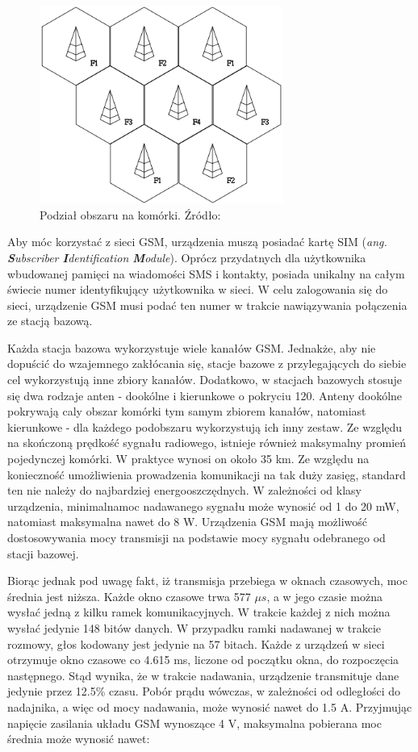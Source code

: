 \begin{figure}[H]
	\centering
	\includegraphics[width=8cm]{img/theory/GSM/cell_structure.png}
	\caption{Podział obszaru na komórki. Źródło: \cite{GSM_wiki}}
	\label{fig:image_gsm_cells}
\end{figure}

Aby móc korzystać z sieci GSM, urządzenia muszą posiadać kartę SIM (\textit{ang. \textbf{S}ubscriber \textbf{I}dentification \textbf{M}odule}). Oprócz przydatnych dla użytkownika wbudowanej pamięci na wiadomości SMS i kontakty, posiada unikalny na całym świecie numer identyfikujący użytkownika w sieci. W celu zalogowania się do sieci, urządzenie GSM musi podać ten numer w trakcie nawiązywania połączenia ze stacją bazową. 

Każda stacja bazowa wykorzystuje wiele kanałów GSM. Jednakże, aby nie dopuścić do wzajemnego zakłócania się, stacje bazowe z przylegających do siebie cel wykorzystują inne zbiory kanałów. Dodatkowo, w stacjach bazowych stosuje się dwa rodzaje anten - dookólne i kierunkowe o pokryciu 120\degree. Anteny dookólne pokrywają caly obszar komórki tym samym zbiorem kanałów, natomiast kierunkowe - dla każdego podobszaru wykorzystują ich inny zestaw. Ze względu na skończoną prędkość sygnału radiowego, istnieje również maksymalny promień pojedynczej komórki. W praktyce wynosi on około 35 km. Ze względu na konieczność umożliwienia prowadzenia komunikacji na tak duży zasięg, standard ten nie należy do najbardziej energooszczędnych. W zależności od klasy urządzenia, minimalnamoc nadawanego sygnału może wynosić od 1 do 20 mW, natomiast maksymalna nawet do 8 W. Urządzenia GSM mają możliwość dostosowywania mocy transmisji na podstawie mocy sygnału odebranego od stacji bazowej. 

Biorąc jednak pod uwagę fakt, iż transmisja przebiega w oknach czasowych, moc średnia jest niższa. Każde okno czasowe trwa 577 $\mu s$, a w jego czasie można wysłać jedną z kilku ramek komunikacyjnych. W trakcie każdej z nich można wysłać jedynie 148 bitów danych. W przypadku ramki nadawanej w trakcie rozmowy, głos kodowany jest jedynie na 57 bitach. Każde z urządzeń w sieci otrzymuje okno czasowe co 4.615 ms, liczone od początku okna, do rozpoczęcia następnego. Stąd wynika, że  w trakcie nadawania, urządzenie transmituje dane jedynie przez 12.5\% czasu. Pobór prądu wówczas, w zależności od odległości do nadajnika, a więc od mocy nadawania, może wynosić nawet do 1.5 A. Przyjmując napięcie zasilania układu GSM wynoszące 4 V, maksymalna pobierana moc średnia może wynosić nawet:

